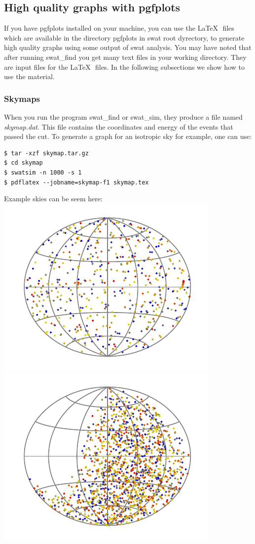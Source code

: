 \documentclass[12pt]{article}
\begin{document}
\subsection{High quality graphs with pgfplots} \label{ch::pgfplots}
If you have pgfplots installed on your machine, you can use the \LaTeX\,\,
files which are available in the directory {\color{textcolor}pgfplots} in swat
root dyrectory, to generate high quality graphs using some output of swat
analysis.  You may have noted that after running {\color{textcolor}swat\_find}
you get many text files in your working directory. They are input files for the
\LaTeX\,\, files. In the following subsections we show how to use the material.
\subsubsection{Skymaps}
When you run the program {\color{textcolor}swat\_find} or {\color{textcolor}swat\_sim}, they produce a file named
{\it skymap.dat}. This file contains the coordinates and energy of the events that
passed the cut. To generate a graph for an isotropic sky for example, one can
use:
{\bf \color{textcolor}
\begin{lstlisting}
$ tar -xzf skymap.tar.gz
$ cd skymap
$ swatsim -n 1000 -s 1
$ pdflatex --jobname=skymap-f1 skymap.tex
\end{lstlisting}
}
Example skies can be seem here:\\
\includegraphics[scale=1.0]{fig/skymap-sim.pdf} 
\includegraphics[scale=1.0]{fig/skymap.pdf}
\end{document}
